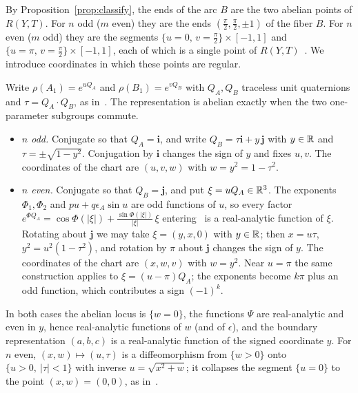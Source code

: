 By Proposition~\ref{prop:classify}, the ends of the arc $B$ are the two abelian points of $R(Y,T)$. For $n$ odd
($m$ even) they are the ends $(\frac\pi2,\frac\pi2,\pm1)$ of the fiber $B$. For $n$ even ($m$ odd) they are the
segments $\{u=0,\,v=\frac\pi2\}\times[-1,1]$ and $\{u=\pi,\,v=\frac\pi2\}\times[-1,1]$, each of which is a single point of
$R(Y,T)$~\cite[Thm.~10.2]{HHK2}. We introduce coordinates in which these points are regular.

Write $\rho(A_1)=e^{uQ_A}$ and $\rho(B_1)=e^{vQ_B}$ with $Q_A,Q_B$ traceless unit quaternions and $\tau=Q_A\cdot Q_B$, as
in~\cite[Thm.~10.2]{HHK2}. The representation is abelian exactly when the two one-parameter subgroups commute.
\begin{itemize}
\item \emph{$n$ odd.} Conjugate so that $Q_A=\mathbf i$, and write $Q_B=\tau\mathbf i+y\,\mathbf j$ with $y\in\mathbb{R}$ and $\tau=\pm\sqrt{1-y^2}$.
Conjugation by $\mathbf i$ changes the sign of $y$ and fixes $u,v$. The coordinates of the chart are
$(u,v,w)$ with $w=y^2=1-\tau^2$.
\item \emph{$n$ even.} Conjugate so that $Q_B=\mathbf j$, and put $\xi=uQ_A\in\mathbb{R}^3$. The exponents
$\Phi_1,\Phi_2$ and $pu+q\epsilon_A\sin u$ are odd functions of $u$, so every factor
$e^{\Phi Q_A}=\cos\Phi(|\xi|)+\frac{\sin\Phi(|\xi|)}{|\xi|}\,\xi$ entering~\cite[(31)]{HHK2} is a real-analytic function of $\xi$.
Rotating about $\mathbf j$ we may take $\xi=(y,x,0)$ with $y\in\mathbb{R}$; then $x=u\tau$, $y^2=u^2(1-\tau^2)$, and rotation by $\pi$
about $\mathbf j$ changes the sign of $y$. The coordinates of the chart are $(x,w,v)$ with $w=y^2$. Near $u=\pi$ the
same construction applies to $\xi=(u-\pi)Q_A$; the exponents become $k\pi$ plus an odd function, which
contributes a sign $(-1)^k$.
\end{itemize}
In both cases the abelian locus is $\{w=0\}$, the functions $\Psi$ are real-analytic and even in $y$, hence
real-analytic functions of $w$ (and of $\epsilon$), and the boundary representation $(a,b,c)$ is a real-analytic
function of the signed coordinate $y$. For $n$ even, $(x,w)\mapsto(u,\tau)$ is a diffeomorphism from
$\{w>0\}$ onto $\{u>0,\ |\tau|<1\}$ with inverse $u=\sqrt{x^2+w}$; it collapses the segment $\{u=0\}$ to the point
$(x,w)=(0,0)$, as in~\cite[Thm.~10.2]{HHK2}.


